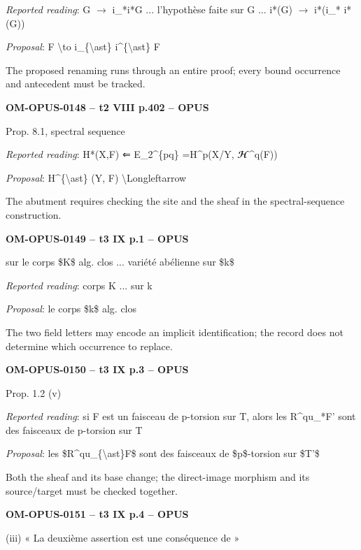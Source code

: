 \emph{Reported reading}: G \ensuremath{\to} i\_*i*G ... l'hypothèse faite sur G ... i*(G) \ensuremath{\to} i*(i\_* i*(G))\par
\emph{Proposal}: F \textbackslash{}to i\_\{\textbackslash{}ast\} i\textasciicircum{}\{\textbackslash{}ast\} F\par
The proposed renaming runs through an entire proof; every bound occurrence and antecedent must be tracked.\par
\par\noindent\textbf{OM-OPUS-0148 -- t2 VIII p.402 -- OPUS}\par
Prop. 8.1, spectral sequence\par
\emph{Reported reading}: H*(X,F) ⇐ E\_2\textasciicircum{}\{pq\} =\allowbreak  H\textasciicircum{}p(X/Y, \ensuremath{𝓗}\textasciicircum{}q(F))\par
\emph{Proposal}: H\textasciicircum{}\{\textbackslash{}ast\} (Y, F) \textbackslash{}Longleftarrow\par
The abutment requires checking the site and the sheaf in the spectral-sequence construction.\par
\par\noindent\textbf{OM-OPUS-0149 -- t3 IX p.1 -- OPUS}\par
sur le corps \$K\$ alg. clos ... variété abélienne sur \$k\$\par
\emph{Reported reading}: corps K ... sur k\par
\emph{Proposal}: le corps \$k\$ alg. clos\par
The two field letters may encode an implicit identification; the record does not determine which occurrence to replace.\par
\par\noindent\textbf{OM-OPUS-0150 -- t3 IX p.3 -- OPUS}\par
Prop. 1.2 (v)\par
\emph{Reported reading}: si F est un faisceau de p-torsion sur T, alors les R\textasciicircum{}qu\_*F' sont des faisceaux de p-torsion sur T\par
\emph{Proposal}: les \$R\textasciicircum{}qu\_\{\textbackslash{}ast\}F\$ sont des faisceaux de \$p\$-torsion sur \$T'\$\par
Both the sheaf and its base change; the direct-image morphism and its source/target must be checked together.\par
\par\noindent\textbf{OM-OPUS-0151 -- t3 IX p.4 -- OPUS}\par
(iii) « La deuxième assertion est une conséquence de »\par
